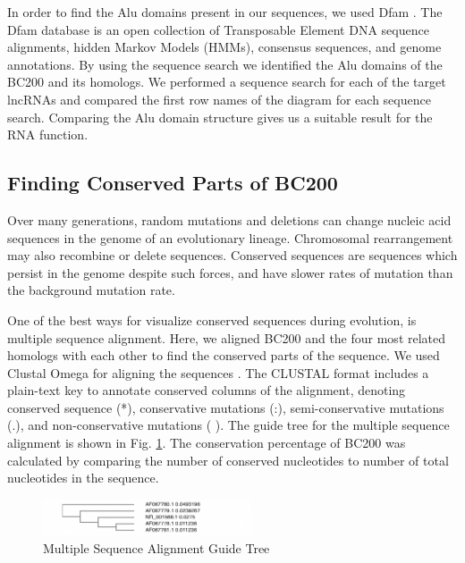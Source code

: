 \documentclass[conference, 11pt]{IEEEtran}
\begin{document}
In order to find the Alu domains present in our sequences, we used Dfam \cite{storer2021dfam}. 
The Dfam database is an open collection of Transposable Element DNA sequence alignments, hidden Markov Models (HMMs), consensus sequences, and genome annotations. 
By using the sequence search we identified the Alu domains of the BC200 and its homologs. 
We performed a sequence search for each of the target lncRNAs and compared the first row names of the diagram for each sequence search. 
Comparing the Alu domain structure gives us a suitable result for the RNA function.

\subsection{Finding Conserved Parts of BC200}

Over many generations, random mutations and deletions can change nucleic acid sequences in the genome of an evolutionary lineage. 
Chromosomal rearrangement may also recombine or delete sequences. 
Conserved sequences are sequences which persist in the genome despite such forces, and have slower rates of mutation than the background mutation rate\cite{kimura1974some}.

One of the best ways for visualize conserved sequences during evolution, is multiple sequence alignment. 
Here, we aligned BC200 and the four most related homologs with each other to find the conserved parts of the sequence. 
We used Clustal Omega for aligning the sequences \cite{madeira2019embl}. 
The CLUSTAL format includes a plain-text key to annotate conserved columns of the alignment, denoting conserved sequence (*), conservative mutations (:), semi-conservative mutations (.), and non-conservative mutations ( ). 
The guide tree for the multiple sequence alignment is shown in Fig. \ref{fig:Guide-tree}. 
The conservation percentage of BC200 was calculated by comparing the number of conserved nucleotides to number of total nucleotides in the sequence.

\begin{figure}[ht]
  \centering
  \includegraphics[width=0.55\textwidth]{figs/guidetree.png}
  \caption{Multiple Sequence Alignment Guide Tree}
  \label{fig:Guide-tree}
\end{figure}
\end{document}
